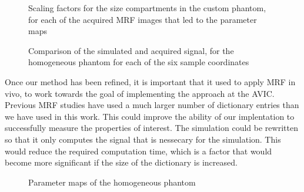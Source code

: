 \documentclass[journal]{IEEEtran}
\newlength\figureheight
\newlength\figurewidth
\begin{document}
\begin{figure*}
\centering
\begin{minipage}[c]{\textwidth}
\setlength{}
\setlength{}



    \caption{Scaling factors for the size compartments in the custom phantom, for each of the acquired MRF images that led to the parameter maps}
    \label{fig:JackcompartmentScales2}
\end{minipage}
\end{figure*}


\begin{figure*}
\centering
\begin{minipage}[c]{\textwidth}

\setlength{}
\setlength{}


\caption{Comparison of the simulated and acquired signal, for the homogeneous phantom for each of the six sample coordinates}
    \label{fig:sphereD170simCom3}
 
\end{minipage}
\end{figure*}

Once our method has been refined, it is important that it used to apply MRF in vivo, to work towards the goal of implementing the approach at the AVIC. 
Previous MRF studies have used a much larger number of dictionary entries than we have used in this work. This could improve the ability of our implentation to successfully measure the properties of interest.
The simulation could be rewritten so that it only computes the signal that is nessecary for the simulation. This would reduce the required computation time, which is a factor that would become more significant if the size of the dictionary is increased.





\begin{figure}
\centering
\begin{minipage}[c]{\columnwidth}

\setlength{}
\setlength{}

\setlength{}
\setlength{}

\setlength{}
\setlength{}

\setlength{}
\setlength{}

    \caption{Parameter maps of the homogeneous phantom}
    \label{fig:sphereD170list3}
\end{minipage}
\end{figure}
\end{document}

